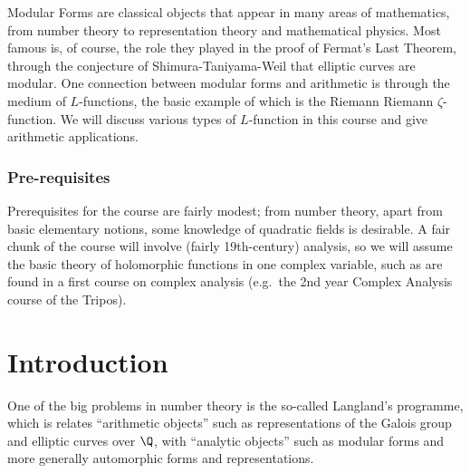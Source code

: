 \documentclass[a4paper]{article}
\begin{document}
\maketitle
{\small
\setlength{\parindent}{0em}
\setlength{\parskip}{1em}
Modular Forms are classical objects that appear in many areas of mathematics, from number theory to representation theory and mathematical physics. Most famous is, of course, the role they played in the proof of Fermat's Last Theorem, through the conjecture of Shimura-Taniyama-Weil that elliptic curves are modular. One connection between modular forms and arithmetic is through the medium of $L$-functions, the basic example of which is the Riemann Riemann $\zeta$-function. We will discuss various types of $L$-function in this course and give arithmetic applications.

\subsubsection*{Pre-requisites}
Prerequisites for the course are fairly modest; from number theory, apart from basic elementary notions, some knowledge of quadratic fields is desirable. A fair chunk of the course will involve (fairly 19th-century) analysis, so we will assume the basic theory of holomorphic functions in one complex variable, such as are found in a first course on complex analysis (e.g.\ the 2nd year Complex Analysis course of the Tripos).
}
\tableofcontents

\setcounter{section}{-1}
\section{Introduction}
One of the big problems in number theory is the so-called Langland's programme, which is relates ``arithmetic objects'' such as representations of the Galois group and elliptic curves over $\Q$, with ``analytic objects'' such as modular forms and more generally automorphic forms and representations.
\end{document}
